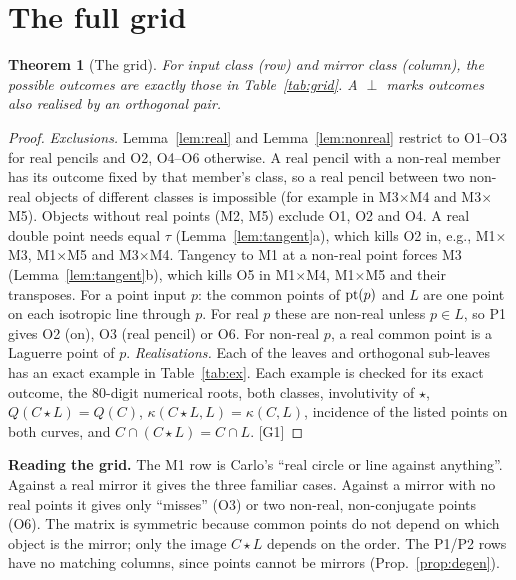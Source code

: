 \documentclass[11pt]{article}
\newtheorem{theorem}{Theorem}[section]\newtheorem{proposition}[theorem]{Proposition}
\theoremstyle{definition}\newtheorem{definition}[theorem]{Definition}\newtheorem{remark}[theorem]{Remark}\newtheorem{example}[theorem]{Example}
\newcommand{\chk}[1]{\hfill{\footnotesize\textsf{[#1]}}}
\newcommand{\cls}[1]{\textsf{#1}}
\begin{document}
\section{The full grid}\label{sec:grid}
\begin{theorem}[The grid]\label{thm:grid}
For input class (row) and mirror class (column), the possible outcomes are exactly those in Table~\ref{tab:grid}. A $\perp$ marks outcomes also realised by an orthogonal pair.
\end{theorem}
\begin{table}[h]\centering\small
{}
\caption{Outcome codes (O1--O6 written as 1--6) per cell. There are \cntleaf{} leaves (cell, outcome), and \cntleafo{} of them are also realised orthogonally, spread over \cntorthcells{} cells. \chk{G0, G2}}\label{tab:grid}
\end{table}
\begin{proof}
\emph{Exclusions.} Lemma~\ref{lem:real} and Lemma~\ref{lem:nonreal} restrict to O1--O3 for real pencils and O2, O4--O6 otherwise. A real pencil with a non-real member has its outcome fixed by that member's class, so a real pencil between two non-real objects of different classes is impossible (for example in \cls{M3}$\times$\cls{M4} and \cls{M3}$\times$\cls{M5}). Objects without real points (\cls{M2}, \cls{M5}) exclude O1, O2 and O4. A real double point needs equal $\tau$ (Lemma~\ref{lem:tangent}a), which kills O2 in, e.g., \cls{M1}$\times$\cls{M3}, \cls{M1}$\times$\cls{M5} and \cls{M3}$\times$\cls{M4}. Tangency to \cls{M1} at a non-real point forces \cls{M3} (Lemma~\ref{lem:tangent}b), which kills O5 in \cls{M1}$\times$\cls{M4}, \cls{M1}$\times$\cls{M5} and their transposes. For a point input $p$: the common points of $\mathrm{pt}(p)$ and $L$ are one point on each isotropic line through $p$. For real $p$ these are non-real unless $p\in L$, so \cls{P1} gives O2 (on), O3 (real pencil) or O6. For non-real $p$, a real common point is a Laguerre point of $p$.
\emph{Realisations.} Each of the \cntleaf{} leaves and \cntleafo{} orthogonal sub-leaves has an exact example in Table~\ref{tab:ex}. Each example is checked for its exact outcome, the 80-digit numerical roots, both classes, involutivity of $\star$, $Q(C\star L)=Q(C)$, $\kappa(C\star L,L)=\kappa(C,L)$, incidence of the listed points on both curves, and $C\cap(C\star L)=C\cap L$. \chk{G1}
\end{proof}

\noindent\textbf{Reading the grid.} The \cls{M1} row is Carlo's ``real circle or line against anything''. Against a real mirror it gives the three familiar cases. Against a mirror with no real points it gives only ``misses'' (O3) or two non-real, non-conjugate points (O6). The matrix is symmetric because common points do not depend on which object is the mirror; only the image $C\star L$ depends on the order. The \cls{P1}/\cls{P2} rows have no matching columns, since points cannot be mirrors (Prop.~\ref{prop:degen}).
\end{document}
